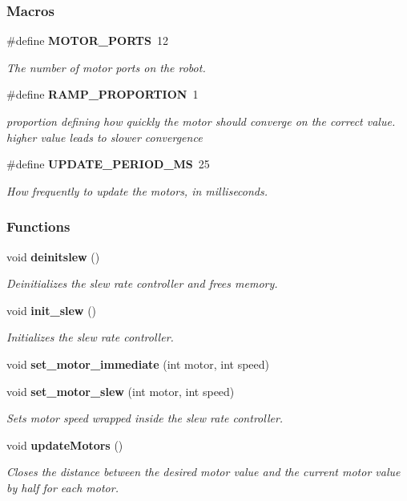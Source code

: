\subsubsection*{Macros}
\begin{DoxyCompactItemize}
\item 
\#define \textbf{ M\+O\+T\+O\+R\+\_\+\+P\+O\+R\+TS}~12
\begin{DoxyCompactList}\small\item\em The number of motor ports on the robot. \end{DoxyCompactList}\item 
\#define \textbf{ R\+A\+M\+P\+\_\+\+P\+R\+O\+P\+O\+R\+T\+I\+ON}~1
\begin{DoxyCompactList}\small\item\em proportion defining how quickly the motor should converge on the correct value. higher value leads to slower convergence \end{DoxyCompactList}\item 
\#define \textbf{ U\+P\+D\+A\+T\+E\+\_\+\+P\+E\+R\+I\+O\+D\+\_\+\+MS}~25
\begin{DoxyCompactList}\small\item\em How frequently to update the motors, in milliseconds. \end{DoxyCompactList}\end{DoxyCompactItemize}
\subsubsection*{Functions}
\begin{DoxyCompactItemize}
\item 
void \textbf{ deinitslew} ()
\begin{DoxyCompactList}\small\item\em Deinitializes the slew rate controller and frees memory. \end{DoxyCompactList}\item 
void \textbf{ init\+\_\+slew} ()
\begin{DoxyCompactList}\small\item\em Initializes the slew rate controller. \end{DoxyCompactList}\item 
void \textbf{ set\+\_\+motor\+\_\+immediate} (int motor, int speed)
\item 
void \textbf{ set\+\_\+motor\+\_\+slew} (int motor, int speed)
\begin{DoxyCompactList}\small\item\em Sets motor speed wrapped inside the slew rate controller. \end{DoxyCompactList}\item 
void \textbf{ update\+Motors} ()
\begin{DoxyCompactList}\small\item\em Closes the distance between the desired motor value and the current motor value by half for each motor. \end{DoxyCompactList}\end{DoxyCompactItemize}


